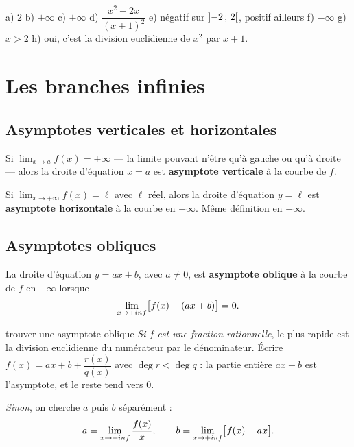 \begin{corrige}[automatismes]
a) $2$ \quad b) $+\infty$ \quad c) $+\infty$ \quad
d) $\dfrac{x^{2}+2x}{(x+1)^{2}}$ \quad e) négatif sur $\left]-2\,;\,2\right[$,
positif ailleurs \quad f) $-\infty$ \quad g) $x > 2$ \quad
h) oui, c'est la division euclidienne de $x^{2}$ par $x+1$.
\end{corrige}

\section{Les branches infinies}

\subsection{Asymptotes verticales et horizontales}

\begin{definition}
Si $\displaystyle\lim_{x \to a} f(x) = \pm\infty$ — la limite pouvant n'être
qu'à gauche ou qu'à droite — alors la droite d'équation $x = a$ est
\textbf{asymptote verticale} à la courbe de $f$.
\end{definition}

\begin{definition}
Si $\displaystyle\lim_{x \to +\infty} f(x) = \ell$ avec $\ell$ réel, alors la
droite d'équation $y = \ell$ est \textbf{asymptote horizontale} à la courbe en
$+\infty$. Même définition en $-\infty$.
\end{definition}

\subsection{Asymptotes obliques}

\begin{definition}
La droite d'équation $y = ax+b$, avec $a \neq 0$, est \textbf{asymptote
oblique} à la courbe de $f$ en $+\infty$ lorsque
\[
  \limpinf \bigl[f(x) - (ax+b)\bigr] = 0 .
\]
\end{definition}

\begin{methode}{trouver une asymptote oblique}
\emph{Si $f$ est une fraction rationnelle}, le plus rapide est la division
euclidienne du numérateur par le dénominateur. Écrire
$f(x) = ax+b+\dfrac{r(x)}{q(x)}$ avec $\deg r < \deg q$ : la partie entière
$ax+b$ est l'asymptote, et le reste tend vers $0$.

\smallskip
\emph{Sinon}, on cherche $a$ puis $b$ séparément :
\[
  a = \limpinf \frac{f(x)}{x}, \qquad b = \limpinf \bigl[f(x)-ax\bigr].
\]
\end{methode}

